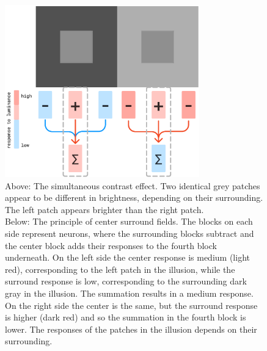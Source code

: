 \begin{figure}[H]
    \centering
    \centering
    \includegraphics[width=0.75\textwidth]{media/centre_surround.png}
    \begin{minipage}{0.8\textwidth}
    \caption[The principle of center surround fields]{Above: The simultaneous contrast
    effect. Two identical grey patches appear to be different in brightness, depending on
    their surrounding. The left patch appears brighter than the right patch. \\ Below: The
    principle of center surround fields. The blocks on each side represent neurons, where
    the surrounding blocks subtract and the center block adds their responses to the
    fourth block underneath. On the left side the center response is medium (light red),
    corresponding to the left patch in the illusion, while the surround response is low,
    corresponding to the surrounding dark gray in the illusion. The summation results in a
    medium response. On the right side the center is the same, but the surround response
    is higher (dark red) and so the summation in the fourth block is lower. The responses
    of the patches in the illusion depends on their surrounding.}
    \label{fig:figure4}
    \end{minipage}
\end{figure}



